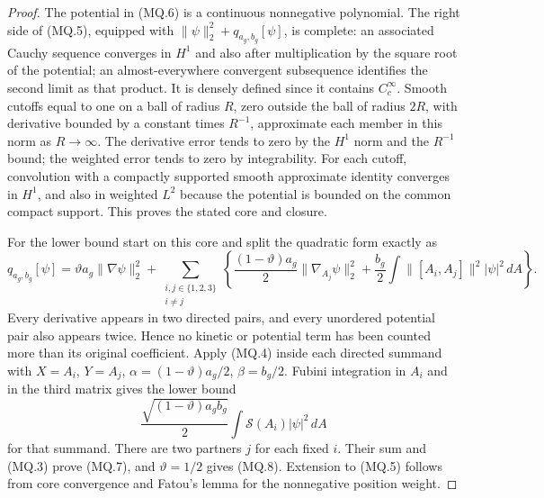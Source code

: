 \begin{proof}
The potential in (MQ.6) is a continuous nonnegative polynomial.
The right side of (MQ.5), equipped with
$\|\psi\|_2^2+q_{a_g,b_g}[\psi]$, is complete: an associated Cauchy
sequence converges in $H^1$ and also after multiplication by the
square root of the potential; an almost-everywhere convergent
subsequence identifies the second limit as that product.
It is densely defined since it contains $C_c^\infty$.
Smooth cutoffs equal to one on a ball of radius $R$, zero outside
the ball of radius $2R$, with derivative bounded by a constant
times $R^{-1}$, approximate each member in this norm as $R\to\infty$.
The derivative error tends to zero by the $H^1$ norm and the
$R^{-1}$ bound; the weighted error tends to zero by integrability.
For each cutoff, convolution with a compactly supported smooth
approximate identity converges in $H^1$, and also in weighted
$L^2$ because the potential is bounded on the common compact
support. This proves the stated core and closure.

For the lower bound start on this core and split the quadratic form
exactly as
\[
 q_{a_g,b_g}[\psi]=
 \vartheta a_g\|\nabla\psi\|_2^2+
 \sum_{\substack{i,j\in\{1,2,3\}\\i\ne j}}
 \left\{\frac{(1-\vartheta)a_g}{2}\|\nabla_{A_j}\psi\|_2^2
       +\frac{b_g}{2}\int\|[A_i,A_j]\|^2|\psi|^2\,dA\right\}.
                                                               \tag{MQ.9}
\]
Every derivative appears in two directed pairs, and every unordered
potential pair also appears twice. Hence no kinetic or potential
term has been counted more than its original coefficient.
Apply (MQ.4) inside each directed summand with $X=A_i$,
$Y=A_j$, $\alpha=(1-\vartheta)a_g/2$, $\beta=b_g/2$.
Fubini integration in $A_i$ and in the third matrix gives the lower
bound
\[
 \frac{\sqrt{(1-\vartheta)a_gb_g}}2
       \int\mathcal S(A_i)|\psi|^2\,dA
\]
for that summand. There are two partners $j$ for each fixed $i$.
Their sum and (MQ.3) prove (MQ.7), and $\vartheta=1/2$ gives
(MQ.8). Extension to (MQ.5) follows from core convergence and
Fatou's lemma for the nonnegative position weight.


\end{proof}
